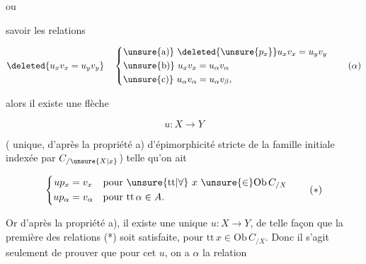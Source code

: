 ou


savoir les relations

{\makeatletter\tagsleft@true\makeatother
\[
\deleted{u_xv_x=u_yv_y}\quad
\left\{\begin{aligned}
&\unsure{\mathrm a)}\ \deleted{\unsure{p_x}}u_xv_x=u_yv_y\\
&\unsure{\mathrm b)}\ u_xv_x=u_\alpha v_\alpha\\
&\unsure{\mathrm c)}\ u_\alpha v_\alpha=u_\alpha v_\beta,
\end{aligned}\right. \tag*{$(\alpha)$}
\]
}

alors il existe une flèche 

\[ u:X\longrightarrow Y \]

( unique, d'après la propriété a) d'épimorphicité stricte de la famille initiale indexée par $C_{/\unsure{X|x}}$) telle qu'on ait

{\makeatletter\tagsleft@true\makeatother
\[
\left\{\begin{aligned}
up_x&=v_x &&\text{pour }\unsure{\mathrm{tt}|\forall}\ x\ \unsure{\in}\mathrm{Ob}\,C_{/X}\\
up_\alpha&=v_\alpha &&\text{pour }\mathrm{tt}\,\alpha\in A.
\end{aligned}\right. \tag*{$(*)$}
\]
}

Or d'après la propriété a), il existe une unique $u:X\longrightarrow Y$, de telle façon que la première des relations (*) soit satisfaite, pour $\mathrm{tt}\,x\in\mathrm{Ob}\,C_{/X}$. Donc il s'agit seulement de prouver que pour cet $u$, on a  $\alpha$ la relation
